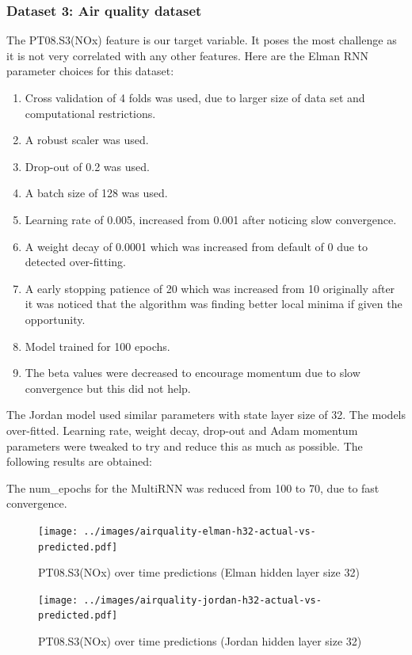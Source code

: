 \documentclass[conference]{IEEEtran}
\begin{document}
\subsubsection{Dataset 3: Air quality dataset}

The PT08.S3(NOx) feature is our target variable. It poses the most challenge as it is not very correlated with any other features. Here are the Elman RNN parameter choices for this dataset:

\begin{enumerate}[]
	\item Cross validation of 4 folds was used, due to larger size of data set and computational restrictions.
	\item A robust scaler was used.
	\item Drop-out of 0.2 was used.
	\item A batch size of 128 was used.
	\item Learning rate of 0.005, increased from 0.001 after noticing slow convergence.
	\item A weight decay of 0.0001 which was increased from default of 0 due to detected over-fitting.
	\item A early stopping patience of 20 which was increased from 10 originally after it was noticed that the algorithm was finding better local minima if given the opportunity.
	\item Model trained for 100 epochs.
	\item The beta values were decreased to encourage momentum due to slow convergence but this did not help.
\end{enumerate}

The Jordan model used similar parameters with state layer size of 32. The models over-fitted. Learning rate, weight decay, drop-out and Adam momentum parameters were tweaked to try and reduce this as much as possible. The following results are obtained:

The num\_epochs for the MultiRNN was reduced from 100 to 70, due to fast convergence.

\begin{figure}[H] 
	\centering
	\texttt{[image: ../images/airquality-elman-h32-actual-vs-predicted.pdf]}
	\caption{PT08.S3(NOx) over time predictions (Elman hidden layer size 32)}
	\label{fig:aq-predictions-elman}
\end{figure}

\begin{figure}[H] 
	\centering
	\texttt{[image: ../images/airquality-jordan-h32-actual-vs-predicted.pdf]}
	\caption{PT08.S3(NOx) over time predictions (Jordan hidden layer size 32)}
	\label{fig:aq-predictions-jordan}
\end{figure}
\end{document}
